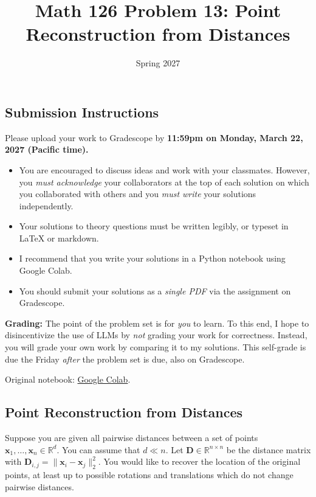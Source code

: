 \documentclass{article}
\title{Math 126 Problem 13: Point Reconstruction from Distances}
\author{} %
\date{Spring 2027}
\begin{document}
\maketitle

\hypertarget{submission-instructions}{%
\subsection*{Submission Instructions}\label{submission-instructions}}

Please upload your work to Gradescope by \textbf{11:59pm on Monday, March 22, 2027 (Pacific time).}

\begin{itemize}
\item
  You are encouraged to discuss ideas and work with your classmates. However, you \emph{must acknowledge} your collaborators at the top of each solution on which you collaborated with others and you \emph{must write} your solutions independently.
\item
  Your solutions to theory questions must be written legibly, or typeset in LaTeX or markdown.
\item
  I recommend that you write your solutions in a Python notebook using Google Colab.
\item
  You should submit your solutions as a \emph{single PDF} via the assignment on Gradescope.
\end{itemize}

\textbf{Grading:} The point of the problem set is for \emph{you} to learn. To this end, I hope to disincentivize the use of LLMs by \emph{not} grading your work for correctness. Instead, you will grade your own work by comparing it to my solutions. This self-grade is due the Friday \emph{after} the problem set is due, also on Gradescope.

\noindent Original notebook: \href{https://colab.research.google.com/drive/1T_F7Jp4Ts38uBG8D4GGSW33pY70OzFbg?usp=sharing}{Google Colab}.

\hypertarget{point-reconstruction-from-distances}{%
\subsection*{Point Reconstruction from Distances}\label{point-reconstruction-from-distances}}

Suppose you are given all pairwise distances between a set of points \(\mathbf{x}_1, \ldots, \mathbf{x}_n \in \mathbb{R}^d\). You can assume that \(d \ll n\). Let \(\mathbf{D} \in \mathbb{R}^{n \times n}\) be the distance matrix with \(\mathbf{D}_{i,j} = \| \mathbf{x}_i - \mathbf{x}_j \|_2^2\). You would like to recover the location of the original points, at least up to possible rotations and translations which do not change pairwise distances.
\end{document}
